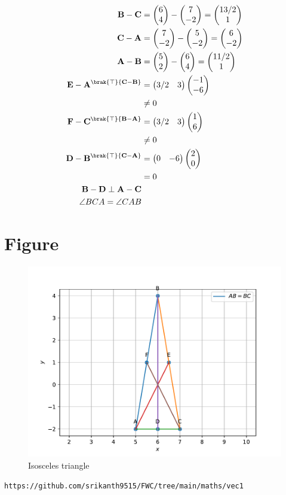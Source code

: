 \documentclass{article}
\newcommand{\myvec}[1]{\ensuremath{\begin{pmatrix}#1\end{pmatrix}}}
\let\vec\mathbf
\begin{document}
\begin{align}
\vec{B}-\vec{C}&=\myvec{6 \\ 4}-\myvec{7 \\-2} =\myvec{13/2 \\ 1}\\
\vec{C}-\vec{A}&=\myvec{7 \\-2}-\myvec{5 \\-2} =\myvec{6 \\-2}\\
\vec{A}-\vec{B}&=\myvec{5 \\ 2}-\myvec{6 \\ 4} =\myvec{11/2 \\ 1}\\
{\vec{E}-\vec{A}}^\brak{\top}{\vec{C}-\vec{B}}&= \myvec{3/2 & 3}\myvec{-1 \\ -6}\\
&\neq0\\
	{\vec{F}-\vec{C}}^\brak{\top}{\vec{B}-\vec{A}}&= \myvec{3/2 & 3}\myvec{1 \\ 6}\\
&\neq 0\\
{\vec{D}-\vec{B}}^\brak{\top}{\vec{C}-\vec{A}}&= \myvec{0 & -6}\myvec{2 \\ 0}\\
&=0 \\
{\vec{B} -\vec{D}}\perp {\vec{A} -\vec{C}}\\
\angle BCA = \angle CAB  
\end{align}
\pagebreak\section{Figure}
\begin{figure}[h]
\includegraphics[width=\columnwidth]{par.pdf}
\caption{Isosceles triangle}
		\label{fig:Figure}
\end{figure}
\begin{lstlisting}
https://github.com/srikanth9515/FWC/tree/main/maths/vec1
\end{lstlisting}
\end{document}
